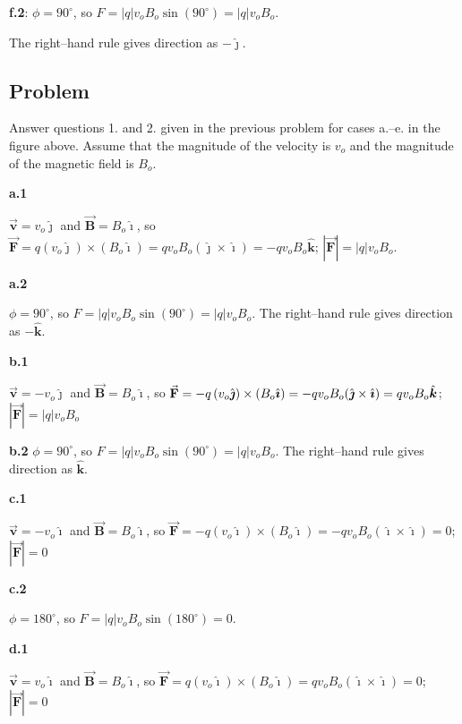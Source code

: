 \documentclass{article}
\newcommand{\ihat}[0]{\hat{\boldsymbol{\imath}}}
\newcommand{\jhat}[0]{\hat{\boldsymbol{\jmath}}}
\newcommand{\khat}[0]{\hat{\boldsymbol{k}}}
\newcommand{\bfvec}[1]{\vec{\mathbf{#1}}}
\begin{document}
\textbf{f.2}: $\phi=90^{\circ}$, so $F = |q|v_oB_o\sin(90^{\circ})=|q|v_oB_o$.

The right--hand rule gives direction as $-\jhat$.

\subsection{Problem}

Answer questions 1. and 2. given in the previous problem for cases a.--e. in the figure above. Assume that the magnitude of the velocity is $v_o$ and the magnitude of the magnetic field is $B_o$.

{\bf a.1}

\ifsolutions
$\bfvec{v}=v_o\jhat$ and $\bfvec{B}=B_o\ihat$, so $\bfvec{F} = q(v_o\jhat)\times (B_o\ihat)=qv_oB_o(\jhat\times \ihat)=-qv_oB_o\khat$; $|\bfvec{F}|=|q|v_oB_o$. 
\else

\vskip 36pt
\fi

{\bf a.2}

\ifsolutions
$\phi=90^{\circ}$, so $F = |q|v_oB_o\sin(90^{\circ})=|q|v_oB_o$. The right--hand rule gives direction as $-\khat$.
\fi

{\bf b.1}

\ifsolutions
$\bfvec{v}=-v_o\jhat$ and $\bfvec{B}=B_o\ihat$, so $\bfvec{F} = -q\thinspace (v_o\jhat)\times (B_o\ihat)=-qv_oB_o(\jhat\times \ihat)=qv_oB_o\khat$; $|\bfvec{F}|=|q|v_oB_o$
\else

\vskip 48pt
\fi

{\bf b.2}
\ifsolutions
$\phi=90^{\circ}$, so $F = |q|v_oB_o\sin(90^{\circ})=|q|v_oB_o$. The right--hand rule gives direction as $\khat$.
\else

\vskip 48pt
\fi

{\bf c.1}

\ifsolutions
$\bfvec{v}=-v_o\ihat$ and $\bfvec{B}=B_o\ihat$, so $\bfvec{F} = -q(v_o\ihat)\times (B_o\ihat)=-qv_oB_o(\ihat\times \ihat)=0$; $|\bfvec{F}|=0$
\else

\vskip 48pt
\fi

{\bf c.2}

\ifsolutions
$\phi=180^{\circ}$, so $F = |q|v_oB_o\sin(180^{\circ})=0$.
\else

\vskip 48pt
\fi

{\bf d.1}

\ifsolutions
$\bfvec{v}=v_o\ihat$ and $\bfvec{B}=B_o\ihat$, so $\bfvec{F} = q(v_o\ihat)\times (B_o\ihat)=qv_oB_o(\ihat\times \ihat)=0$; $|\bfvec{F}|=0$
\else

\vskip 48pt
\fi
\end{document}
